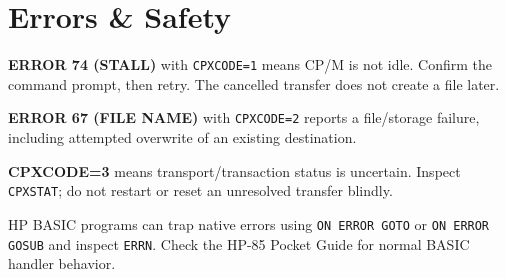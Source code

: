 \documentclass[10pt]{article}
\begin{document}
\section{Errors \& Safety}
\textbf{ERROR 74 (STALL)} with \texttt{CPXCODE=1} means CP/M is not idle. Confirm the command prompt, then retry. The cancelled transfer does not create a file later.
\par\smallskip
\textbf{ERROR 67 (FILE NAME)} with \texttt{CPXCODE=2} reports a file/storage failure, including attempted overwrite of an existing destination.
\par\smallskip
\textbf{CPXCODE=3} means transport/transaction status is uncertain. Inspect \texttt{CPXSTAT}; do not restart or reset an unresolved transfer blindly.
\par\smallskip
HP BASIC programs can trap native errors using \texttt{ON ERROR GOTO} or \texttt{ON ERROR GOSUB} and inspect \texttt{ERRN}. Check the HP-85 Pocket Guide for normal BASIC handler behavior.
\end{document}
